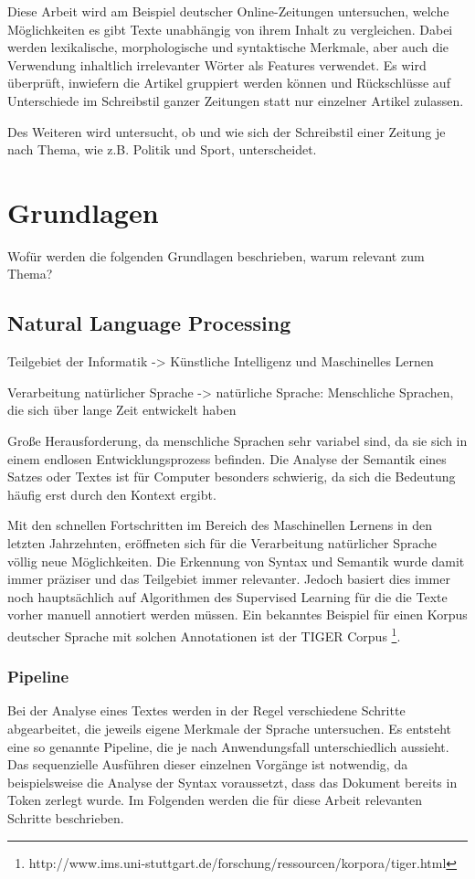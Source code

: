 Diese Arbeit wird am Beispiel deutscher Online-Zeitungen untersuchen, welche Möglichkeiten es gibt Texte unabhängig von ihrem Inhalt zu vergleichen. Dabei werden lexikalische, morphologische und syntaktische Merkmale, aber auch die Verwendung inhaltlich irrelevanter Wörter als Features verwendet. Es wird überprüft, inwiefern die Artikel gruppiert werden können und Rückschlüsse auf Unterschiede im Schreibstil ganzer Zeitungen statt nur einzelner Artikel zulassen.

Des Weiteren wird untersucht, ob und wie sich der Schreibstil einer Zeitung je nach Thema, wie z.B. Politik und Sport, unterscheidet.

\chapter{Grundlagen}
Wofür werden die folgenden Grundlagen beschrieben, warum relevant zum Thema?

\section{Natural Language Processing}
Teilgebiet der Informatik -> Künstliche Intelligenz und Maschinelles Lernen

Verarbeitung natürlicher Sprache
-> natürliche Sprache: Menschliche Sprachen, die sich über lange Zeit entwickelt haben

Große Herausforderung, da menschliche Sprachen sehr variabel sind, da sie sich in einem endlosen Entwicklungsprozess befinden. Die Analyse der Semantik eines Satzes oder Textes ist für Computer besonders schwierig, da sich die Bedeutung häufig erst durch den Kontext ergibt.

Mit den schnellen Fortschritten im Bereich des Maschinellen Lernens in den letzten Jahrzehnten, eröffneten sich für die Verarbeitung natürlicher Sprache völlig neue Möglichkeiten. Die Erkennung von Syntax und Semantik wurde damit immer präziser und das Teilgebiet immer relevanter. Jedoch basiert dies immer noch hauptsächlich auf Algorithmen des Supervised Learning für die die Texte vorher manuell annotiert werden müssen. Ein bekanntes Beispiel für einen Korpus deutscher Sprache mit solchen Annotationen ist der TIGER Corpus \footnote{http://www.ims.uni-stuttgart.de/forschung/ressourcen/korpora/tiger.html}.

\subsection{Pipeline}
Bei der Analyse eines Textes werden in der Regel verschiedene Schritte abgearbeitet, die jeweils eigene Merkmale der Sprache untersuchen. Es entsteht eine so genannte Pipeline, die je nach Anwendungsfall unterschiedlich aussieht. Das sequenzielle Ausführen dieser einzelnen Vorgänge ist notwendig, da beispielsweise die Analyse der Syntax voraussetzt, dass das Dokument bereits in Token zerlegt wurde. Im Folgenden werden die für diese Arbeit relevanten Schritte beschrieben.

